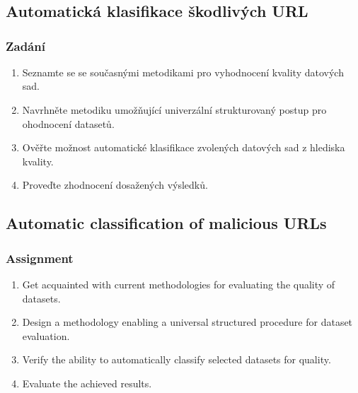 \chapter*{}

\section*{Automatická klasifikace škodlivých URL}

\subsection*{Zadání}

\begin{enumerate}
    \item Seznamte se se současnými metodikami pro vyhodnocení kvality datových sad.
    \item Navrhněte metodiku umožňující univerzální strukturovaný postup pro ohodnocení datasetů.
    \item Ověřte možnost automatické klasifikace zvolených datových sad z hlediska kvality.
    \item Proveďte zhodnocení dosažených výsledků.
\end{enumerate}

\vspace{3.5cm}

\section*{Automatic classification of malicious URLs}

\subsection*{Assignment}

\begin{enumerate}
    \item Get acquainted with current methodologies for evaluating the quality of datasets.
    \item Design a methodology enabling a universal structured procedure for dataset evaluation.
    \item Verify the ability to automatically classify selected datasets for quality.
    \item Evaluate the achieved results.
\end{enumerate}
